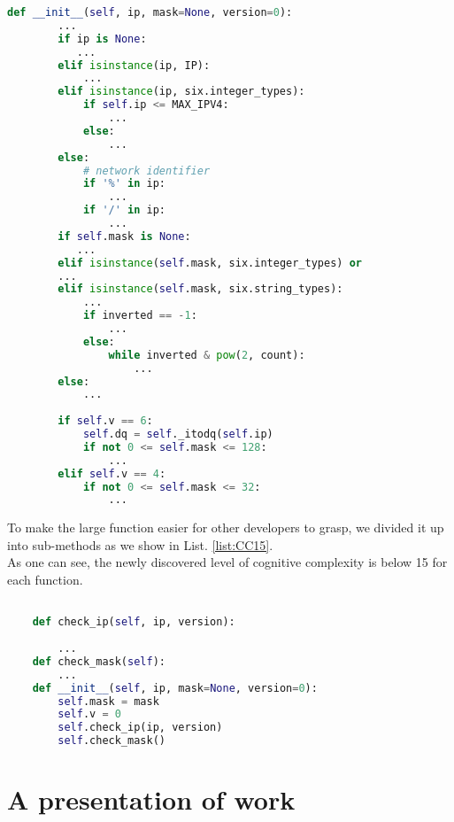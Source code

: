 \documentclass[unicode,11pt,a4paper,oneside,numbers=endperiod,openany]{scrartcl}
\begin{document}
\begin{lstlisting}[language=Python, caption=Cognitive Complexity 31, label=list:CC31]
def __init__(self, ip, mask=None, version=0):
        ...
        if ip is None:
           ...
        elif isinstance(ip, IP):
            ...
        elif isinstance(ip, six.integer_types):
            if self.ip <= MAX_IPV4:
                ...
            else:
                ...
        else:
            # network identifier
            if '%' in ip:
                ...
            if '/' in ip:
                ...
        if self.mask is None:
           ...
        elif isinstance(self.mask, six.integer_types) or 
        ...
        elif isinstance(self.mask, six.string_types):
            ...
            if inverted == -1:
                ...
            else:
                while inverted & pow(2, count):
                    ...
        else:
            ...
        
        if self.v == 6:
            self.dq = self._itodq(self.ip)
            if not 0 <= self.mask <= 128:
                ...
        elif self.v == 4:
            if not 0 <= self.mask <= 32:
                ...

\end{lstlisting}
To make the large function easier for other developers to grasp, we divided it up into sub-methods as we show in List. \ref{list:CC15}. \\
As one can see, the newly discovered level of cognitive complexity is below 15 for each function.

        
\begin{lstlisting}[language=Python, caption=Cognitive Complexity after Refactoring, label=list:CC15]

    def check_ip(self, ip, version):
        
        ...
    def check_mask(self):
        ...
    def __init__(self, ip, mask=None, version=0):
        self.mask = mask
        self.v = 0
        self.check_ip(ip, version)
        self.check_mask()
\end{lstlisting}

\section{A presentation of work}

\end{document}
